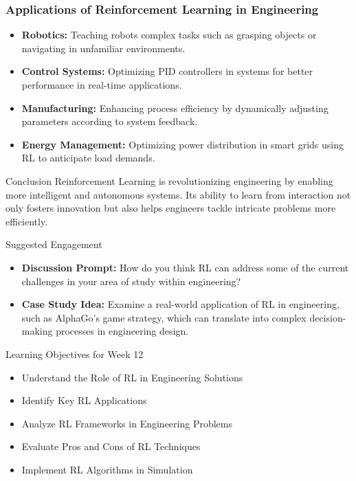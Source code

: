 \documentclass[aspectratio=169]{beamer}
\begin{document}
\begin{frame}[fragile]
    \frametitle{Applications of Reinforcement Learning in Engineering}
    \begin{itemize}
        \item \textbf{Robotics:} Teaching robots complex tasks such as grasping objects or navigating in unfamiliar environments.
        \item \textbf{Control Systems:} Optimizing PID controllers in systems for better performance in real-time applications.
        \item \textbf{Manufacturing:} Enhancing process efficiency by dynamically adjusting parameters according to system feedback.
        \item \textbf{Energy Management:} Optimizing power distribution in smart grids using RL to anticipate load demands.
    \end{itemize}
    
    \begin{block}{Conclusion}
        Reinforcement Learning is revolutionizing engineering by enabling more intelligent and autonomous systems. 
        Its ability to learn from interaction not only fosters innovation but also helps engineers tackle intricate problems more efficiently.
    \end{block}
    
    \begin{block}{Suggested Engagement}
        \begin{itemize}
            \item \textbf{Discussion Prompt:} How do you think RL can address some of the current challenges in your area of study within engineering?
            \item \textbf{Case Study Idea:} Examine a real-world application of RL in engineering, such as AlphaGo's game strategy, which can translate into complex decision-making processes in engineering design.
        \end{itemize}
    \end{block}
\end{frame}

\begin{frame}[fragile]{Learning Objectives for Week 12}
    \begin{itemize}
        \item Understand the Role of RL in Engineering Solutions
        \item Identify Key RL Applications
        \item Analyze RL Frameworks in Engineering Problems
        \item Evaluate Pros and Cons of RL Techniques
        \item Implement RL Algorithms in Simulation
    \end{itemize}
\end{frame}
\end{document}
